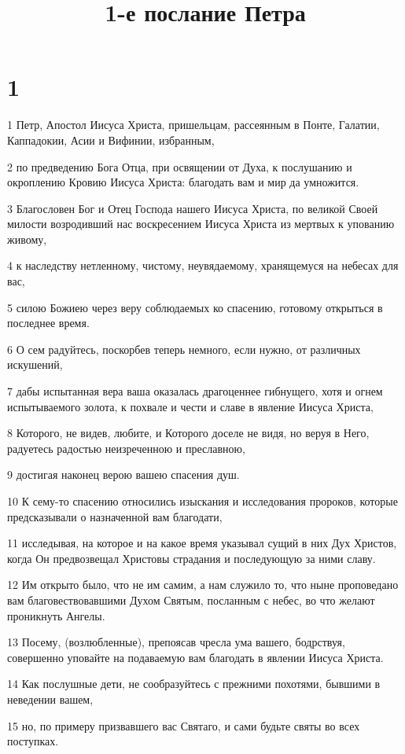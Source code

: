 

\title{1-е послание Петра}


\chapter{1}

\par 1 Петр, Апостол Иисуса Христа, пришельцам, рассеянным в Понте, Галатии, Каппадокии, Асии и Вифинии, избранным,
\par 2 по предведению Бога Отца, при освящении от Духа, к послушанию и окроплению Кровию Иисуса Христа: благодать вам и мир да умножится.
\par 3 Благословен Бог и Отец Господа нашего Иисуса Христа, по великой Своей милости возродивший нас воскресением Иисуса Христа из мертвых к упованию живому,
\par 4 к наследству нетленному, чистому, неувядаемому, хранящемуся на небесах для вас,
\par 5 силою Божиею через веру соблюдаемых ко спасению, готовому открыться в последнее время.
\par 6 О сем радуйтесь, поскорбев теперь немного, если нужно, от различных искушений,
\par 7 дабы испытанная вера ваша оказалась драгоценнее гибнущего, хотя и огнем испытываемого золота, к похвале и чести и славе в явление Иисуса Христа,
\par 8 Которого, не видев, любите, и Которого доселе не видя, но веруя в Него, радуетесь радостью неизреченною и преславною,
\par 9 достигая наконец верою вашею спасения душ.
\par 10 К сему-то спасению относились изыскания и исследования пророков, которые предсказывали о назначенной вам благодати,
\par 11 исследывая, на которое и на какое время указывал сущий в них Дух Христов, когда Он предвозвещал Христовы страдания и последующую за ними славу.
\par 12 Им открыто было, что не им самим, а нам служило то, что ныне проповедано вам благовествовавшими Духом Святым, посланным с небес, во что желают проникнуть Ангелы.
\par 13 Посему, (возлюбленные), препоясав чресла ума вашего, бодрствуя, совершенно уповайте на подаваемую вам благодать в явлении Иисуса Христа.
\par 14 Как послушные дети, не сообразуйтесь с прежними похотями, бывшими в неведении вашем,
\par 15 но, по примеру призвавшего вас Святаго, и сами будьте святы во всех поступках.
